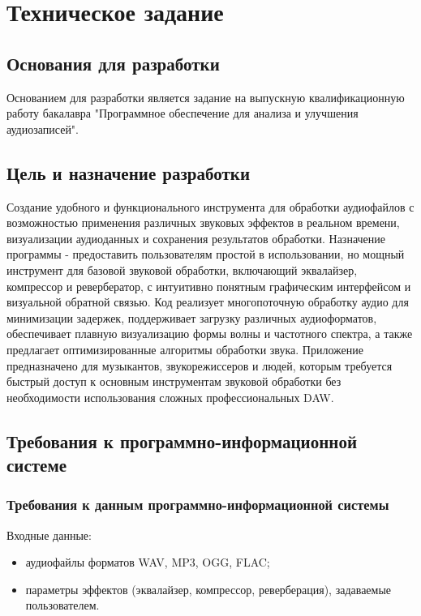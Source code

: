 \section{Техническое задание}

\subsection{Основания для разработки}

Основанием для разработки является задание на выпускную квалификационную работу бакалавра "Программное обеспечение для анализа и улучшения аудиозаписей".

\subsection{Цель и назначение разработки}

Создание удобного и функционального инструмента для обработки аудиофайлов с возможностью применения различных звуковых эффектов в реальном времени, визуализации аудиоданных и сохранения результатов обработки. Назначение программы - предоставить пользователям простой в использовании, но мощный инструмент для базовой звуковой обработки, включающий эквалайзер, компрессор и ревербератор, с интуитивно понятным графическим интерфейсом и визуальной обратной связью. Код реализует многопоточную обработку аудио для минимизации задержек, поддерживает загрузку различных аудиоформатов, обеспечивает плавную визуализацию формы волны и частотного спектра, а также предлагает оптимизированные алгоритмы обработки звука. Приложение предназначено для музыкантов, звукорежиссеров и людей, которым требуется быстрый доступ к основным инструментам звуковой обработки без необходимости использования сложных профессиональных DAW.

\subsection{Требования к программно-информационной системе}

\subsubsection{Требования к данным программно-информационной системы}

Входные данные:
\begin{itemize}
	\item аудиофайлы форматов WAV, MP3, OGG, FLAC;
	\item параметры эффектов (эквалайзер, компрессор, реверберация), задаваемые пользователем.
\end{itemize}

